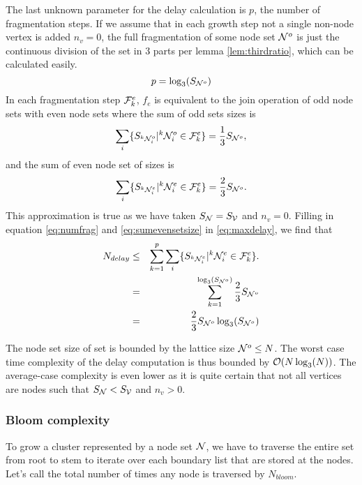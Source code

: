 The last unknown parameter for the delay calculation is $p$, the number of fragmentation steps. If we assume that in each growth step not a single non-node vertex is added $n_v = 0$, the full fragmentation of some node set $\mathcal{N}^o$ is just the continuous division of the set in 3 parts per lemma \ref{lem:thirdratio}, which can be calculated easily.
\begin{equation}\label{eq:numfrag}
  p = \log_3(S_{\mathcal{N}^o})
\end{equation}
In each fragmentation step $\mathcal{F}^e_k$, $f_e$ is equivalent to the join operation of odd node sets with even node sets where the sum of odd sets sizes is
\begin{equation}\label{eq:sumoddsetsize}
  \sum_i \{ S_{{}^{k}\mathcal{N}_i^o} | {}^{k}\mathcal{N}_i^o \in \mathcal{F}^e_k \} = \frac{1}{3}S_{\mathcal{N}^o},
\end{equation}
and the sum of even node set of sizes is
\begin{equation}\label{eq:sumevensetsize}
  \sum_i \{ S_{{}^{k}\mathcal{N}_i^e} | {}^{k}\mathcal{N}_i^e \in \mathcal{F}^e_k \} = \frac{2}{3}S_{\mathcal{N}^o}.
\end{equation}
This approximation is true as we have taken $S_{\mathcal{N}} = S_{\mathcal{V}}$ and $n_v=0$. Filling in equation \ref{eq:numfrag} and \ref{eq:sumevensetsize} in \ref{eq:maxdelay}, we find that
\begin{eqnarray}
\nonumber  N_{delay} &\leq& \sum_{k=1}^{p} \sum_i \{ S_{{}^{k}\mathcal{N}_i^e} | {}^{k}\mathcal{N}_i^e \in \mathcal{F}^e_k \}. \\
\nonumber   &=& \sum_{k=1}^{\log_3(S_{\mathcal{N}^o})} \frac{2}{3}S_{\mathcal{N}^o} \\
   &=& \frac{2}{3}S_{\mathcal{N}^o}\log_3(S_{\mathcal{N}^o})
\end{eqnarray}

The node set size of set is bounded by the lattice size $\mathcal{N}^o \leq N$. The worst case time complexity of the delay computation is thus bounded by $\mathcal{O}(N\log_3(N))$. The average-case complexity is even lower as it is quite certain that not all vertices are nodes such that $S_{\mathcal{N}} < S_{\mathcal{V}}$ and $n_v > 0$.

\subsubsection{Bloom complexity}

To grow a cluster represented by a node set $\mathcal{N}$, we have to traverse the entire set from root to stem to iterate over each boundary list that are stored at the nodes. Let's call the total number of times any node is traversed by  $N_{bloom}$.

